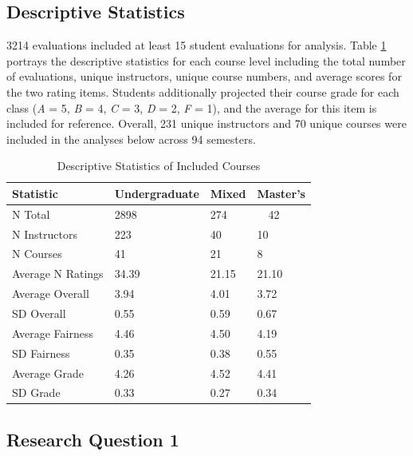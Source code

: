 \documentclass[
  man]{apa7}
\begin{document}
\hypertarget{descriptive-statistics}{%
\subsection{Descriptive Statistics}\label{descriptive-statistics}}

3214 evaluations included at least 15 student evaluations
for analysis. Table \ref{tab:table1} portrays the descriptive
statistics for each course level including the total number of
evaluations, unique instructors, unique course numbers, and average
scores for the two rating items. Students additionally projected their
course grade for each class (\emph{A} = 5, \emph{B} = 4, \emph{C} = 3, \emph{D} = 2, \emph{F} =
1), and the average for this item is included for reference. Overall,
231 unique instructors and
70 unique courses were included in
the analyses below across 94
semesters.

\begin{table}[tbp]

\begin{center}
\begin{threeparttable}

\caption{\label{tab:table1}Descriptive Statistics of Included Courses}

\begin{tabular}{llll}
\toprule
Statistic & Undergraduate & Mixed & Master's\\
\midrule
N Total & 2898 & 274 & \ \ 42\\
N Instructors & 223 & 40 & 10\\
N Courses & 41 & 21 & 8\\
Average N Ratings & 34.39 & 21.15 & 21.10\\
Average Overall & 3.94 & 4.01 & 3.72\\
SD Overall & 0.55 & 0.59 & 0.67\\
Average Fairness & 4.46 & 4.50 & 4.19\\
SD Fairness & 0.35 & 0.38 & 0.55\\
Average Grade & 4.26 & 4.52 & 4.41\\
SD Grade & 0.33 & 0.27 & 0.34\\
\bottomrule
\end{tabular}

\end{threeparttable}
\end{center}

\end{table}

\hypertarget{research-question-1-1}{%
\subsection{Research Question 1}\label{research-question-1-1}}
\end{document}
